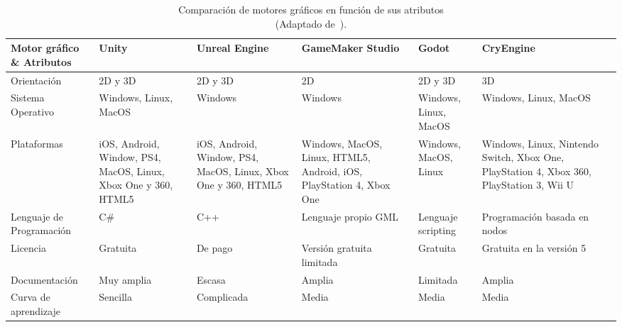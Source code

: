 \begin{table}[ht]
    \hspace*{-25pt}
    \centering
    \begin{tabularx}{1.1\textwidth}{|X|X|X|X|X|X|X|}
        \hline
        \textbf{Motor gráfico  \& Atributos} & \textbf{Unity} & \textbf{Unreal Engine} & \textbf{GameMaker Studio} & \textbf{Godot} & \textbf{CryEngine}\\\hline
        Orientación                 & 2D y 3D                                                       &2D y 3D                                                          & 2D                            & 2D y 3D               & 3D \\\hline
        Sistema Operativo           & Windows, Linux, MacOS                                           & Windows                                                         & Windows                       & Windows, Linux, MacOS               & Windows, Linux, MacOS\\\hline
        Plataformas                 & iOS, Android, Window, PS4, MacOS,  Linux, Xbox One y 360, HTML5 & iOS, Android, Window, PS4, MacOS,  Linux, Xbox One y 360, HTML5   & Windows, MacOS, Linux, HTML5, Android, iOS, PlayStation 4, Xbox One & Windows, MacOS, Linux    & Windows, Linux, Nintendo Switch, Xbox One, PlayStation 4, Xbox 360, PlayStation 3, Wii U\\\hline
        Lenguaje de Programación    & C\#                                                           & C++                                                             & Lenguaje propio GML           & Lenguaje scripting & Programación basada en nodos \\\hline
        Licencia                    & Gratuita                                                      & De pago                                                         & Versión gratuita limitada     & Gratuita              &  Gratuita en la versión 5\\\hline
        Documentación               & Muy amplia                                                    & Escasa                                                          & Amplia                        & Limitada              & Amplia\\\hline
        Curva de aprendizaje        & Sencilla                                                      & Complicada                                                      & Media                         & Media                 & Media \\\hline
    \end{tabularx}
    \caption{Comparación de motores gráficos en función de sus atributos \\ (Adaptado de~\cite{gonjar2019desarrollo}).}
    \label{tab: graphics-engines}
\end{table}


